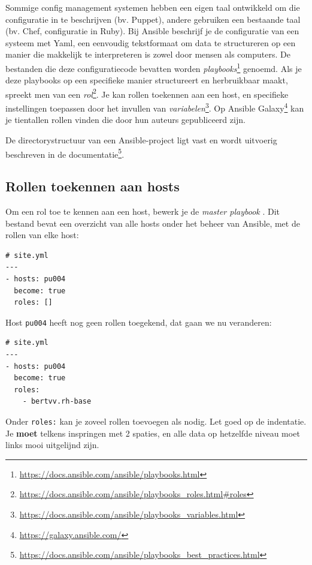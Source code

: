 Sommige config management systemen hebben een eigen taal ontwikkeld om die configuratie in te beschrijven (bv. Puppet), andere gebruiken een bestaande taal (bv. Chef, configuratie in Ruby). Bij Ansible beschrijf je de configuratie van een systeem met Yaml, een eenvoudig tekstformaat om data te structureren op een manier die makkelijk te interpreteren is zowel door mensen als computers. De bestanden die deze configuratiecode bevatten worden \emph{playbooks}\footnote{\url{https://docs.ansible.com/ansible/playbooks.html}} genoemd. Als je deze playbooks op een specifieke manier structureert en herbruikbaar maakt, spreekt men van een \emph{rol}\footnote{\url{https://docs.ansible.com/ansible/playbooks_roles.html\#roles}}. Je kan rollen toekennen aan een host, en specifieke instellingen toepassen door het invullen van \emph{variabelen}\footnote{\url{https://docs.ansible.com/ansible/playbooks_variables.html}}. Op Ansible Galaxy\footnote{\url{https://galaxy.ansible.com/}} kan je tientallen rollen vinden die door hun auteurs gepubliceerd zijn.

De directorystructuur van een Ansible-project ligt vast en wordt uitvoerig beschreven in de documentatie\footnote{\url{https://docs.ansible.com/ansible/playbooks_best_practices.html}}.

\subsection{Rollen toekennen aan hosts}
\label{sub:rollen-toekennen-aan-hosts}

Om een rol toe te kennen aan een host, bewerk je de \emph{master playbook} . Dit bestand bevat een overzicht van alle hosts onder het beheer van Ansible, met de rollen van elke host:

\begin{verbatim}
# site.yml
---
- hosts: pu004
  become: true
  roles: []
\end{verbatim}

Host \texttt{pu004} heeft nog geen rollen toegekend, dat gaan we nu veranderen:

\begin{verbatim}
# site.yml
---
- hosts: pu004
  become: true
  roles:
    - bertvv.rh-base
\end{verbatim}

Onder \texttt{roles:} kan je zoveel rollen toevoegen als nodig. Let goed op de indentatie. Je \textbf{moet} telkens inspringen met 2 spaties, en alle data op hetzelfde niveau moet links mooi uitgelijnd zijn.

